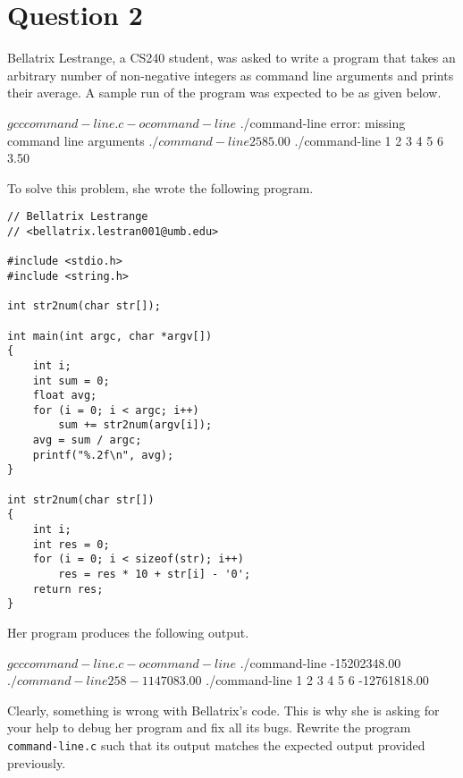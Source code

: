 
\section*{Question 2}

Bellatrix Lestrange, a CS240 student, was asked to write a program that takes an arbitrary number of non-negative integers as command line arguments and prints their average.
A sample run of the program was expected to be as given below.

\begin{terminal}
$ gcc command-line.c -o command-line
$ ./command-line
error: missing command line arguments
$ ./command-line 2 5 8
5.00
$ ./command-line 1 2 3 4 5 6
3.50
\end{terminal}

To solve this problem, she wrote the following program.

\lstset{language=c,tabsize=4}
\begin{lstlisting}
// Bellatrix Lestrange
// <bellatrix.lestran001@umb.edu>

#include <stdio.h>
#include <string.h>

int str2num(char str[]);

int main(int argc, char *argv[])
{
	int i;
	int sum = 0;
	float avg;
	for (i = 0; i < argc; i++)
		sum += str2num(argv[i]);
	avg = sum / argc;
	printf("%.2f\n", avg);
}

int str2num(char str[])
{
	int i;
	int res = 0;
	for (i = 0; i < sizeof(str); i++)
		res = res * 10 + str[i] - '0';
	return res;
}
\end{lstlisting}

Her program produces the following output.

\begin{terminal}
$ gcc command-line.c -o command-line
$ ./command-line
-15202348.00
$ ./command-line 2 5 8
-1147083.00
$ ./command-line 1 2 3 4 5 6
-12761818.00
\end{terminal}

Clearly, something is wrong with Bellatrix's code.
This is why she is asking for your help to debug her program and fix all its bugs.
Rewrite the program \texttt{command-line.c} such that its output matches the expected output provided previously.
